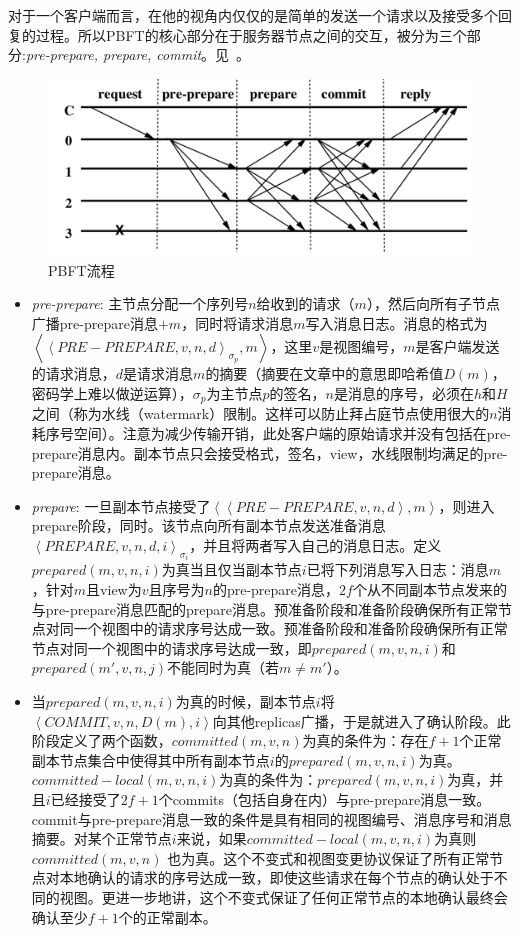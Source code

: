 对于一个客户端而言，在他的视角内仅仅的是简单的发送一个请求以及接受多个回复的过程。所以PBFT的核心部分在于服务器节点之间的交互，被分为三个部分:\emph{pre-prepare, prepare, commit}。见~。
\begin{figure}
	\centering
	\includegraphics[width=1\textwidth]{../common/PBFT_1.png}
	\caption{PBFT流程} 
	\label{fig:PBFT1}
\end{figure}
\begin{itemize}
	\item \emph{pre-prepare}: 主节点分配一个序列号$n$给收到的请求（$m$），然后向所有子节点广播pre-prepare消息$+m$，同时将请求消息$m$写入消息日志。消息的格式为$\left\langle\left\langle PRE-PREPARE,v,n,d\right\rangle _{\sigma_p},m\right\rangle$，这里$v$是视图编号，$m$是客户端发送的请求消息，$d$是请求消息$m$的摘要（摘要在文章中的意思即哈希值$D(m)$，密码学上难以做逆运算），$\sigma_p$为主节点$p$的签名，$n$是消息的序号，必须在$h$和$H$之间（称为水线（watermark）限制。这样可以防止拜占庭节点使用很大的$n$消耗序号空间）。注意为减少传输开销，此处客户端的原始请求并没有包括在pre-prepare消息内。副本节点只会接受格式，签名，view，水线限制均满足的pre-prepare消息。
	
    \item \emph{prepare}: 一旦副本节点接受了$\left\langle\left\langle PRE-PREPARE,v,n,d\right\rangle,m\right\rangle$，则进入prepare阶段，同时。该节点向所有副本节点发送准备消息$\left\langle PREPARE,v,n,d,i \right\rangle_{\sigma_i	}$，并且将两者写入自己的消息日志。定义$prepared(m,v,n,i)$为真当且仅当副本节点$i$已将下列消息写入日志：消息$m$，针对$m$且view为$v$且序号为$n$的pre-prepare消息，$2f$个从不同副本节点发来的与pre-prepare消息匹配的prepare消息。预准备阶段和准备阶段确保所有正常节点对同一个视图中的请求序号达成一致。预准备阶段和准备阶段确保所有正常节点对同一个视图中的请求序号达成一致，即$prepared(m,v,n,i)$和$prepared(m',v,n,j)$不能同时为真（若$m\neq m'$）。
    
    \item 当$prepared(m,v,n,i)$为真的时候，副本节点$i$将$\left\langle COMMIT,v,n,D(m),i\right\rangle$向其他replicas广播，于是就进入了确认阶段。此阶段定义了两个函数，$committed(m,v,n)$为真的条件为：存在$f+1$个正常副本节点集合中使得其中所有副本节点$i$的$prepared(m,v,n,i)$为真。$committed-local(m,v,n,i)$为真的条件为：$prepared(m,v,n,i)$为真，并且$i$已经接受了$2f+1$个commits（包括自身在内）与pre-prepare消息一致。commit与pre-prepare消息一致的条件是具有相同的视图编号、消息序号和消息摘要。对某个正常节点$i$来说，如果$committed-local(m,v,n,i)$为真则$committed(m,v,n)$	也为真。这个不变式和视图变更协议保证了所有正常节点对本地确认的请求的序号达成一致，即使这些请求在每个节点的确认处于不同的视图。更进一步地讲，这个不变式保证了任何正常节点的本地确认最终会确认至少$f+1$个的正常副本。
\end{itemize}
